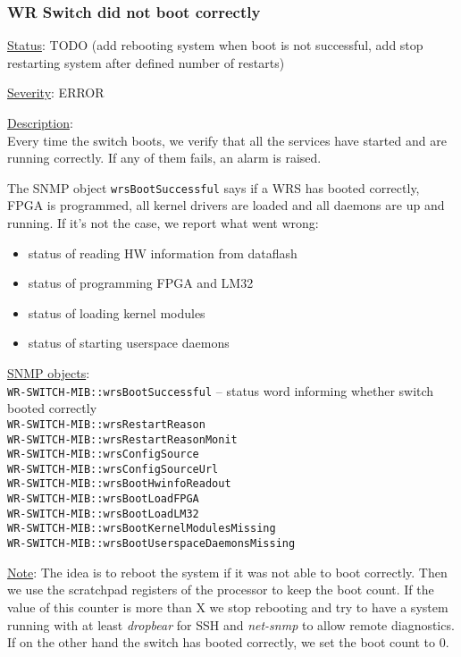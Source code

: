 \subsubsection{\bf WR Switch did not boot correctly}
		\label{fail:other:boot}
		\begin{packed_enum}
			\item [] \underline{Status}: TODO (add rebooting system when boot is
				 not successful, add stop restarting system after defined number of restarts)
			\item [] \underline{Severity}: ERROR
			\item [] \underline{Description}:\\
				Every time the switch boots, we verify that all the services have
				started and are running correctly. If any of them fails, an alarm is
				raised.

				The SNMP object \texttt{wrsBootSuccessful} says if a WRS has booted
				correctly, FPGA is programmed, all kernel drivers are loaded and all
				daemons are up and running. If it's not the case, we report what went
				wrong:
				\begin{itemize}
					\item status of reading HW information from dataflash
					\item status of programming FPGA and LM32
					\item status of loading kernel modules
					\item status of starting userspace daemons
				\end{itemize}
			\item [] \underline{SNMP objects}:\\
				\texttt{WR-SWITCH-MIB::wrsBootSuccessful} -- status word informing whether switch booted correctly\\
				\texttt{WR-SWITCH-MIB::wrsRestartReason}\\
				\texttt{WR-SWITCH-MIB::wrsRestartReasonMonit}\\
				\texttt{WR-SWITCH-MIB::wrsConfigSource}\\
				\texttt{WR-SWITCH-MIB::wrsConfigSourceUrl}\\
				\texttt{WR-SWITCH-MIB::wrsBootHwinfoReadout}\\
				\texttt{WR-SWITCH-MIB::wrsBootLoadFPGA}\\
				\texttt{WR-SWITCH-MIB::wrsBootLoadLM32}\\
				\texttt{WR-SWITCH-MIB::wrsBootKernelModulesMissing}\\
				\texttt{WR-SWITCH-MIB::wrsBootUserspaceDaemonsMissing}
			\item [] \underline{Note}: 
				The idea is to reboot the system if it was not able to boot correctly.
				Then we use the scratchpad registers of the processor to keep
				the boot count. If the value of this counter is more than X we stop
				rebooting and try to have a system running with at least \emph{dropbear}
				for SSH and \emph{net-snmp} to allow remote diagnostics. If on the other
				hand the switch has booted correctly, we set the boot count to 0.
		\end{packed_enum}

